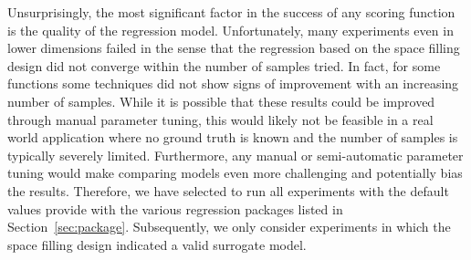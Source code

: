  Unsurprisingly, the most significant factor in the success of any scoring function is the quality of the regression model.
%
Unfortunately, many experiments even in lower dimensions failed in the sense that the regression based on the space filling design did not converge within the number of samples tried.
%
In fact, for some functions some techniques did not show signs of improvement with an increasing number of samples.
%
While it is possible that these results could be improved through manual parameter tuning, this would likely not be feasible in a real world application where no ground truth is known and the number of samples is typically severely limited.
%
Furthermore, any manual or semi-automatic parameter tuning would make comparing models even more challenging and potentially bias the results.
%
Therefore, we have selected to run all experiments with the default values provide with the various regression packages listed in Section~\ref{sec:package}.
%
Subsequently, we only consider experiments in which the space filling design indicated a valid surrogate model.

